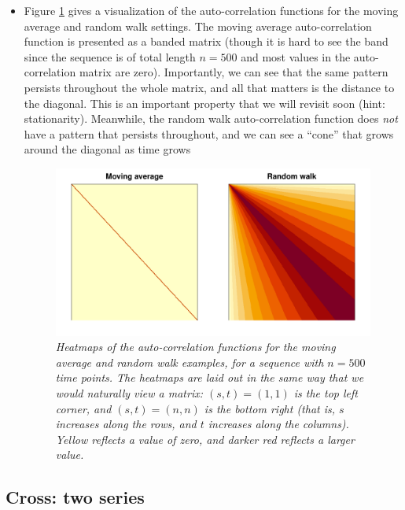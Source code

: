 \documentclass{article}
\begin{document}
\begin{itemize}
\item Figure \ref{fig:heatmap} gives a visualization of the auto-correlation
  functions for the moving average and random walk settings. The moving average
  auto-correlation function is presented as a banded matrix (though it is hard
  to see the band since the sequence is of total length $n=500$ and most values
  in the auto-correlation matrix are zero). Importantly, we can see that the
  same pattern persists throughout the whole matrix, and all that matters is the 
  distance to the diagonal. This is an important property that we will revisit
  soon (hint: stationarity). Meanwhile, the random walk auto-correlation
  function does \emph{not} have a pattern that persists throughout, and we can
  see a ``cone'' that grows around the diagonal as time grows 

\begin{figure}[htb]
\centering
\includegraphics[width=\textwidth]{fig/heatmap-1.pdf}
\caption{\it Heatmaps of the auto-correlation functions for the moving average 
  and random walk examples, for a sequence with $n=500$ time points. The  
  heatmaps are laid out in the same way that we would naturally view a matrix:
  $(s,t) = (1,1)$ is the top left corner, and $(s,t) = (n,n)$ is the bottom
  right (that is, $s$ increases along the rows, and $t$ increases along the
  columns). Yellow reflects a value of zero, and darker red reflects a larger
  value.} 
\label{fig:heatmap}
\end{figure}
\end{itemize}

\subsection{Cross: two series}
\end{document}
